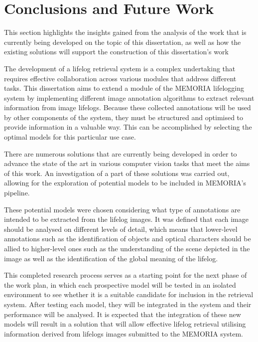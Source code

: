\chapter{Conclusions and Future Work}
\label{chapter:conclusion}

\begin{introduction}
This section highlights the insights gained from the analysis of the work that is currently being developed on the topic of this dissertation, as well as how the existing solutions will support the construction of this dissertation's work
\end{introduction}

The development of a lifelog retrieval system is a complex undertaking that requires effective collaboration across various modules that address different tasks. This dissertation aims to extend a module of the MEMORIA lifelogging system by implementing different image annotation algorithms to extract relevant information from image lifelogs. Because these collected annotations will be used by other components of the system, they must be structured and optimised to provide information in a valuable way. This can be accomplished by selecting the optimal models for this particular use case.

There are numerous solutions that are currently being developed in order to advance the state of the art in various computer vision tasks that meet the aims of this work. An investigation of a part of these solutions was carried out, allowing for the exploration of potential models to be included in MEMORIA's pipeline. 

These potential models were chosen considering what type of annotations are intended to be extracted from the lifelog images. It was defined that each image should be analysed on different levels of detail, which means that lower-level annotations such as the identification of objects and optical characters should be allied to higher-level ones such as the understanding of the scene depicted in the image as well as the identification of the global meaning of the lifelog.

This completed research process serves as a starting point for the next phase of the work plan, in which each prospective model will be tested in an isolated environment to see whether it is a suitable candidate for inclusion in the retrieval system. After testing each model, they will be integrated in the system and their performance will be analysed. It is expected that the integration of these new models will result in a solution that will allow effective lifelog retrieval utilising information derived from lifelogs images submitted to the MEMORIA system.



